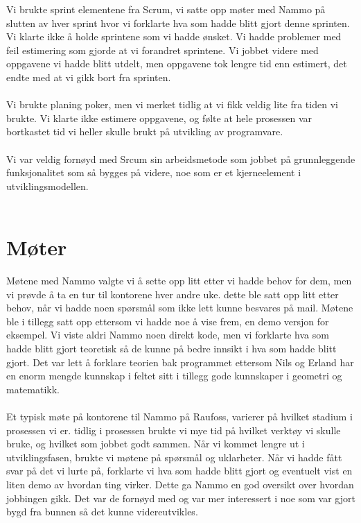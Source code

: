 Vi brukte sprint elementene fra Scrum, vi satte opp møter med Nammo på slutten av hver sprint hvor vi forklarte hva som hadde blitt gjort denne sprinten. Vi klarte ikke å holde sprintene som vi hadde ønsket. Vi hadde problemer med feil estimering som gjorde at vi forandret sprintene. Vi jobbet videre med oppgavene vi hadde blitt utdelt, men oppgavene tok lengre tid enn estimert, det endte med at vi gikk bort fra sprinten.\\ \\
Vi brukte planing poker, men vi merket tidlig at vi fikk veldig lite fra tiden vi brukte. Vi klarte ikke estimere oppgavene,  og følte at hele prosessen var bortkastet tid vi heller skulle brukt på utvikling av programvare.\\ \\
Vi var veldig fornøyd med Srcum sin arbeidsmetode som jobbet på grunnleggende funksjonalitet som så bygges på videre, noe som er et kjerneelement i utviklingsmodellen.\\ \\


\section{Møter}

Møtene med Nammo valgte vi å sette opp litt etter vi hadde behov for dem, men vi prøvde å ta en tur til kontorene hver andre uke. dette ble satt opp litt etter behov, når vi hadde noen spørsmål som ikke lett kunne besvares på mail. Møtene ble i tillegg satt opp ettersom vi hadde noe å vise frem, en demo versjon for eksempel. Vi viste aldri Nammo noen direkt kode, men vi forklarte hva som hadde blitt gjort teoretisk så de kunne på bedre innsikt i hva som hadde blitt gjort. Det var lett å forklare teorien bak programmet ettersom Nils og Erland har en enorm mengde kunnskap i feltet sitt i tillegg gode kunnskaper i geometri og matematikk.\\
\\Et typisk møte på kontorene til Nammo på Raufoss, varierer på hvilket stadium i prosessen vi er. tidlig i prosessen brukte vi mye tid på hvilket verktøy vi skulle bruke, og hvilket som jobbet godt sammen. Når vi kommet lengre ut i utviklingsfasen, brukte vi møtene på spørsmål og uklarheter. Når vi hadde fått svar på det vi lurte på, forklarte vi hva som hadde blitt gjort og eventuelt vist en liten demo av hvordan ting virker. Dette ga Nammo en god oversikt over hvordan jobbingen gikk. Det var de fornøyd med og var mer interessert i noe som var gjort bygd fra bunnen så det kunne videreutvikles.

